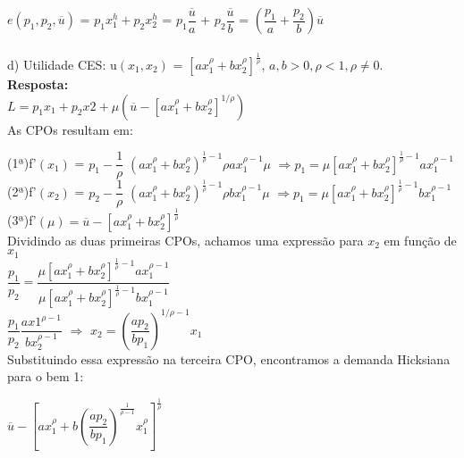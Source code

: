 \begin{enumerate}
{$e(p_{1}, p_{2}, \overline{u})$} = {$p_{1}x^{h}_{1}+ p_{2}x^{h}_{2}$} = {$p_{1}\dfrac{\overline{u}}{a}$} + {$p_{2} \dfrac{\overline{u}}{b}$} = {$\left(\dfrac{p_1}{a} + \dfrac{p_2}{b}\right)\overline{u}$}



\paragraph{}d) Utilidade CES: u{$(x_1, x_2)$} = {$[ax^{\rho}_{1}+bx^{\rho}_{2}]^\frac{1}{\rho}$}, {$a,b > 0, \rho < 1, \rho \neq 0$}. \\

\textbf{Resposta:}\\

{$L = p_{1}x_{1} + p_{2}x{2} + \mu (\overline{u}- [ax_{1}^{\rho} + bx_{2}^{\rho}]^{1/\rho})$}\\

As CPOs resultam em:

(1ª)f'{$(x_{1})$} = {$p_{1} - \dfrac{1}{\rho}$} {$(ax_{1}^{\rho}+bx_{2}^{\rho})^{\frac{1}{\rho}- 1} \rho ax_{1}^{\rho - 1} \mu$} {$\Rightarrow p_{1} = \mu[ax_{1}^{\rho} + bx_{2}^{\rho}]^{\frac{1}{\rho} - 1}ax_{1}^{\rho - 1}$}\\

(2ª)f'{$(x_{2})$} = {$p_{2} - \dfrac{1}{\rho}$} {$(ax_{1}^{\rho}+bx_{2}^{\rho})^{\frac{1}{\rho}- 1} \rho bx_{1}^{\rho - 1} \mu$} {$\Rightarrow p_{1} = \mu[ax_{1}^{\rho} + bx_{2}^{\rho}]^{\frac{1}{\rho} - 1}bx_{1}^{\rho - 1}$}\\

(3ª)f'{$(\mu) = \overline{u} - [ax_{1}^{\rho} + bx_{2}^{\rho}]^{\frac{1}{\rho}}$}\\

Dividindo as duas primeiras CPOs, achamos uma expressão para {$x_{2}$} em função de {$x_{1}$}\\

{$\dfrac{p_{1}}{p_{2}} = \dfrac{\mu[ax_{1}^{\rho} + bx_{2}^{\rho}]^{\frac{1}{\rho}-1}ax_{1}^{\rho-1}}{\mu[ax_{1}^{\rho} + bx_{2}^{\rho}]^{\frac{1}{\rho}-1}bx_{1}^{\rho-1}}$}\\

{$\dfrac{p_{1}}{p_{2}}$}{$\dfrac{ax{1}^{\rho - 1}}{bx_{2}^{\rho - 1}}$} {$\Rightarrow$} 
{$x_{2} =  \left(\dfrac{ap_{2}}{bp_{1}}\right)^{1/\rho-1}x_{1}$}\\

Substituindo essa expressão na terceira CPO, encontramos a demanda Hicksiana para o bem 1:

{$\overline{u} - [ax_{1}^{\rho} + b\left(\dfrac{ap_{2}}{bp_{1}}\right)^{\frac{1}{\rho-1}}x_{1}                   ^{\rho}]^{\frac{1}{\rho}}$}\\




\end{enumerate}
